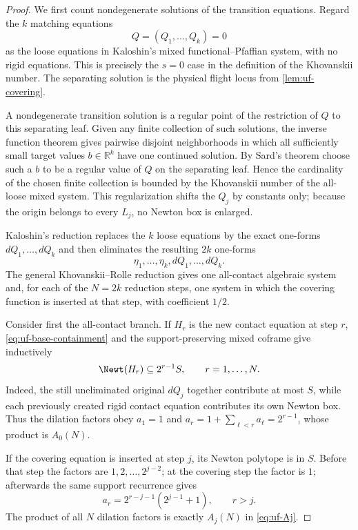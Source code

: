 \begin{proof}
We first count nondegenerate solutions of the transition equations.  Regard the
$k$ matching equations
\[
 Q=(Q_1,\ldots,Q_k)=0
\]
as the loose equations in Kaloshin's mixed functional--Pfaffian system, with
no rigid equations.  This is precisely the $s=0$ case in the definition of the
Khovanskii number.  The separating solution is the physical flight locus from
\cref{lem:uf-covering}.

A nondegenerate transition solution is a regular point of the restriction of
$Q$ to this separating leaf.  Given any finite collection of such solutions,
the inverse function theorem gives pairwise disjoint neighborhoods in which all
sufficiently small target values $b\in\mathbb R^k$ have one continued solution.
By Sard's theorem choose such a $b$ to be a regular value of $Q$ on the
separating leaf.  Hence the cardinality of the chosen finite collection is
bounded by the Khovanskii number of the all-loose mixed system.  This
regularization shifts the $Q_j$ by constants only; because the origin belongs
to every $L_j$, no Newton box is enlarged.

Kaloshin's reduction replaces the $k$ loose equations by the exact one-forms
$dQ_1,\ldots,dQ_k$ and then eliminates the resulting $2k$ one-forms
\[
 \eta_1,\ldots,\eta_k,dQ_1,\ldots,dQ_k.
\]
The general Khovanskii--Rolle reduction gives one all-contact algebraic system
and, for each of the $N=2k$ reduction steps, one system in which the covering
function is inserted at that step, with coefficient $1/2$.

Consider first the all-contact branch.  If $H_r$ is the new contact equation at
step $r$, \eqref{eq:uf-base-containment} and the support-preserving mixed
coframe give inductively
\begin{equation}\label{eq:uf-contact-recursion}
 \Newt(H_r)\subseteq2^{r-1}S,
 \qquad r=1,\ldots,N.
\end{equation}
Indeed, the still uneliminated original $dQ_j$ together contribute at most
$S$, while each previously created rigid contact equation contributes its own
Newton box.  Thus the dilation factors obey
$a_1=1$ and $a_r=1+\sum_{\ell<r}a_\ell=2^{r-1}$, whose product is $A_0(N)$.

If the covering equation is inserted at step $j$, its Newton polytope is in
$S$.  Before that step the factors are $1,2,\ldots,2^{j-2}$; at the covering
step the factor is $1$; afterwards the same support recurrence gives
\[
 a_r=2^{r-j-1}(2^{j-1}+1),\qquad r>j.
\]
The product of all $N$ dilation factors is exactly $A_j(N)$ in
\eqref{eq:uf-Aj}.


\end{proof}
